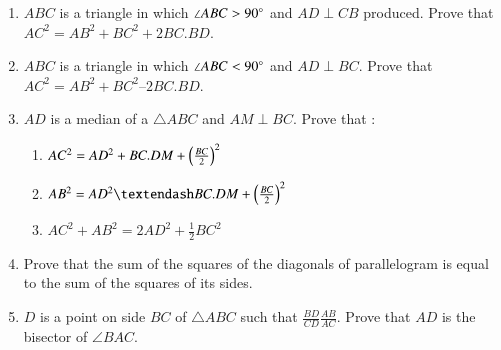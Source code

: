 \begin{enumerate}[label=\arabic*.,ref=\thesubsection.\theenumi]
\item  $ABC$ is a triangle in which  $\angle  ABC > 90\degree$ and $AD  \perp  CB$ produced. Prove that
$ AC^2= AB^2 + BC^2 + 2 BC . BD$.
\item $ABC$ is a triangle in which  $\angle  ABC < 90\degree$ and $AD  \perp  BC$. Prove that $AC^2= AB^2 + BC^2 – 2 BC . BD$.
\item $AD$ is a median of a $\triangle ABC$ and $AM  \perp  BC$. Prove that :
\begin{enumerate}
\item  $AC^2 = AD^2 + BC . DM +
\left(\frac{BC}{ 2}\right)^2$
\item  $AB^2 = AD^2 – BC . DM + \brak{\frac{BC}{ 2}}^
2 $
\item  $AC^2 + AB^2 = 2 AD^2 + \frac{1}{ 2} BC^2$
\end{enumerate}
\item Prove that the sum of the squares of the diagonals of parallelogram is equal to the sum of the squares of its sides.
\item   $D$ is a point on side $BC$ of  $\triangle  ABC$ such that
$\frac{BD}{CD} \frac{AB}{AC}  $.  Prove that $AD$ is the bisector of  $\angle  BAC$.
\end{enumerate}


